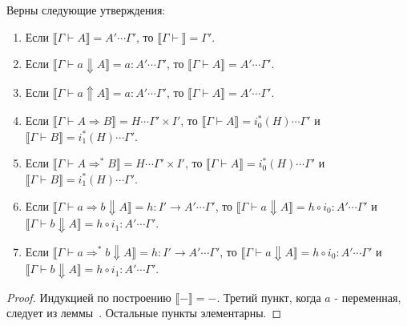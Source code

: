 \documentclass{amsart}
\theoremstyle{definition}
\theoremstyle{remark}
\newcommand{\red}{\Rightarrow}
\renewcommand{\ll}{\llbracket}
\newcommand{\rr}{\rrbracket}
\numberwithin{figure}{section}
\begin{document}
\begin{lem}
Верны следующие утверждения:
\begin{enumerate}
\item Если $\ll \Gamma \vdash A \rr = A' \dotsb \Gamma'$, то $\ll \Gamma \vdash \rr = \Gamma'$.
\item Если $\ll \Gamma \vdash a \Downarrow A \rr = a : A' \dotsb \Gamma'$, то $\ll \Gamma \vdash A \rr = A' \dotsb \Gamma'$.
\item Если $\ll \Gamma \vdash a \Uparrow A \rr = a : A' \dotsb \Gamma'$, то $\ll \Gamma \vdash A \rr = A' \dotsb \Gamma'$.
\item Если $\ll \Gamma \vdash A \red B \rr = H \dotsb \Gamma' \times I'$, то $\ll \Gamma \vdash A \rr = i_0^*(H) \dotsb \Gamma'$ и $\ll \Gamma \vdash B \rr = i_1^*(H) \dotsb \Gamma'$.
\item Если $\ll \Gamma \vdash A \red^* B \rr = H \dotsb \Gamma' \times I'$, то $\ll \Gamma \vdash A \rr = i_0^*(H) \dotsb \Gamma'$ и $\ll \Gamma \vdash B \rr = i_1^*(H) \dotsb \Gamma'$.
\item Если $\ll \Gamma \vdash a \red b \Downarrow A \rr = h : I' \to A' \dotsb \Gamma'$, то $\ll \Gamma \vdash a \Downarrow A \rr = h \circ i_0 : A' \dotsb \Gamma'$ и $\ll \Gamma \vdash b \Downarrow A \rr = h \circ i_1 : A' \dotsb \Gamma'$.
\item Если $\ll \Gamma \vdash a \red^* b \Downarrow A \rr = h : I' \to A' \dotsb \Gamma'$, то $\ll \Gamma \vdash a \Downarrow A \rr = h \circ i_0 : A' \dotsb \Gamma'$ и $\ll \Gamma \vdash b \Downarrow A \rr = h \circ i_1 : A' \dotsb \Gamma'$.
\end{enumerate}
\end{lem}
\begin{proof}
Индукцией по построению $\ll - \rr = -$.
Третий пункт, когда $a$ - переменная, следует из леммы~.
Остальные пункты элементарны.
\end{proof}
\end{document}
